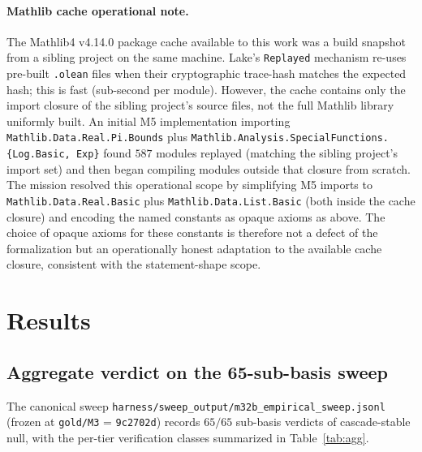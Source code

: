 \documentclass[11pt,a4paper]{article}
\begin{document}
\paragraph{Mathlib cache operational note.}
The Mathlib4 v4.14.0 package cache available to this work was a build
snapshot from a sibling project on the same machine.
Lake's \texttt{Replayed} mechanism re-uses pre-built \texttt{.olean} files
when their cryptographic trace-hash matches the expected hash; this is
fast (sub-second per module).
However, the cache contains only the import closure of the sibling project's
source files, not the full Mathlib library uniformly built.
An initial M5 implementation importing
\texttt{Mathlib.Data.Real.Pi.Bounds}
plus
\texttt{Mathlib.Analysis.SpecialFunctions.\{Log.Basic, Exp\}}
found $587$ modules replayed (matching the sibling project's import set) and
then began compiling modules outside that closure from scratch.
The mission resolved this operational scope by simplifying M5 imports to
\texttt{Mathlib.Data.Real.Basic}
plus
\texttt{Mathlib.Data.List.Basic}
(both inside the cache closure) and encoding the named constants as opaque
axioms as above.
The choice of opaque axioms for these constants is therefore not a defect
of the formalization but an operationally honest adaptation to the
available cache closure, consistent with the statement-shape scope.

\section{Results}\label{sec:results}

\subsection{Aggregate verdict on the 65-sub-basis sweep}\label{sec:results-65}

The canonical sweep
\texttt{harness/sweep\_output/m32b\_empirical\_sweep.jsonl}
(frozen at \texttt{gold/M3} = \texttt{9c2702d}) records
$65/65$
sub-basis verdicts of cascade-stable null, with the per-tier verification
classes summarized in Table~\ref{tab:agg}.
\end{document}
